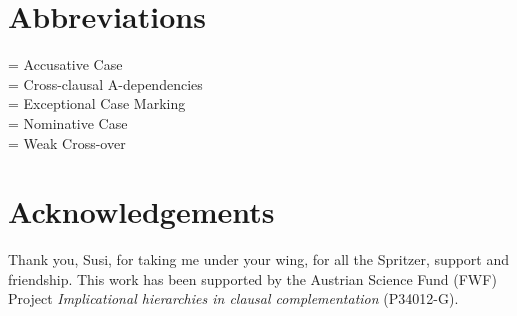 \documentclass[output=paper,colorlinks,citecolor=brown]{langscibook}
\begin{document}
\section*{Abbreviations}
\textbf{} = Accusative Case\\
\textbf{} = Cross-clausal A-dependencies\\
\textbf{} = Exceptional Case Marking\\
\textbf{} = Nominative Case\\
\textbf{} = Weak Cross-over

\section*{Acknowledgements}
Thank you, Susi, for taking me under your wing, for all the Spritzer, support and friendship.
This work has been supported by the Austrian Science Fund (FWF) Project \textit{Implicational hierarchies in clausal complementation} (P34012-G).



\printbibliography[heading=subbibliography,notkeyword=this]
\end{document}
